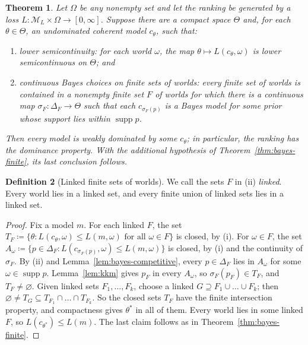 \documentclass[11pt]{article}
\newtheorem{theorem}{Theorem}[section]
\theoremstyle{definition}
\newtheorem{definition}[theorem]{Definition}
\theoremstyle{remark}
\newcommand{\M}{\mathcal M}
\newcommand{\supp}{\operatorname{supp}}
\begin{document}
\begin{theorem}\label{thm:bayes-infinite}
Let $\Omega$ be any nonempty set and let the ranking be generated by a loss $L:\M_L\times\Omega\to[0,\infty]$. Suppose there are a compact space $\Theta$ and, for each $\theta\in\Theta$, an undominated coherent model $c_\theta$, such that:
\begin{enumerate}[label=(\roman*)]
\item \emph{lower semicontinuity}: for each world $\omega$, the map $\theta\mapsto L(c_\theta,\omega)$ is lower semicontinuous on $\Theta$; and
\item \emph{continuous Bayes choices on finite sets of worlds}: every finite set of worlds is contained in a nonempty finite set $F$ of worlds for which there is a continuous map $\sigma_F:\Delta_F\to\Theta$ such that each $c_{\sigma_F(p)}$ is a Bayes model for some prior whose support lies within $\supp p$.
\end{enumerate}
Then every model is weakly dominated by some $c_\theta$; in particular, the ranking has the dominance property. With the additional hypothesis of Theorem~\ref{thm:bayes-finite}, its last conclusion follows.
\end{theorem}
\begin{definition}[Linked finite sets of worlds]\label{def:linked}
We call the sets $F$ in (ii) \emph{linked}. Every world lies in a linked set, and every finite union of linked sets lies in a linked set.
\end{definition}

\begin{proof}
Fix a model $m$. For each linked $F$, the set $T_F\coloneqq\{\theta:L(c_\theta,\omega)\le L(m,\omega)\text{ for all }\omega\in F\}$ is closed, by (i). For $\omega\in F$, the set $A_\omega\coloneqq\{p\in\Delta_F:L(c_{\sigma_F(p)},\omega)\le L(m,\omega)\}$ is closed, by (i) and the continuity of $\sigma_F$. By (ii) and Lemma~\ref{lem:bayes-competitive}, every $p\in\Delta_F$ lies in $A_\omega$ for some $\omega\in\supp p$. Lemma~\ref{lem:kkm} gives $p_F$ in every $A_\omega$, so $\sigma_F(p_F)\in T_F$, and $T_F\ne\varnothing$. Given linked sets $F_1,\dots,F_k$, choose a linked $G\supseteq F_1\cup\dots\cup F_k$; then $\varnothing\ne T_G\subseteq T_{F_1}\cap\dots\cap T_{F_k}$. So the closed sets $T_F$ have the finite intersection property, and compactness gives $\theta^*$ in all of them. Every world lies in some linked $F$, so $L(c_{\theta^*})\le L(m)$. The last claim follows as in Theorem~\ref{thm:bayes-finite}.
\end{proof}
\end{document}
